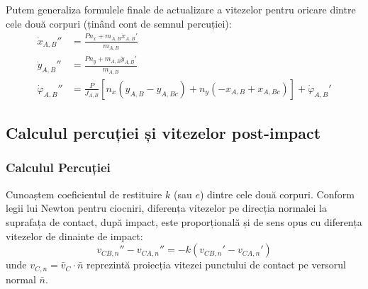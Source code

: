 \documentclass[12pt, a4paper]{article}
\begin{document}
Putem generaliza formulele finale de actualizare a vitezelor pentru oricare dintre cele două corpuri (ținând cont de semnul percuției):
\begin{align}
    \dot{x}_{A,B}'' &= \frac{P n_x + m_{A,B} \dot{x}_{A,B}'}{m_{A,B}} \\
    \dot{y}_{A,B}'' &= \frac{P n_y + m_{A,B} \dot{y}_{A,B}'}{m_{A,B}} \\
    \dot{\varphi}_{A,B}'' &= \frac{P}{J_{A,B}} \left[ n_x(y_{A,B} - y_{A,Bc}) + n_y(-x_{A,B} + x_{A,Bc}) \right] + \dot{\varphi}_{A,B}'
\end{align}

\subsection{Calculul percuției și vitezelor post-impact}
\subsubsection{Calculul Percuției}
Cunoaștem coeficientul de restituire $k$ (sau $e$) dintre cele două corpuri. Conform legii lui Newton pentru ciocniri, diferența vitezelor pe direcția normalei la suprafața de contact, după impact, este proporțională și de sens opus cu diferența vitezelor de dinainte de impact:
\begin{equation}
    v_{CB,n}'' - v_{CA,n}'' = -k \left( v_{CB,n}' - v_{CA,n}' \right)
\end{equation}
unde $v_{C,n} = \bar{v}_C \cdot \bar{n}$ reprezintă proiecția vitezei punctului de contact pe versorul normal $\bar{n}$.
\end{document}
